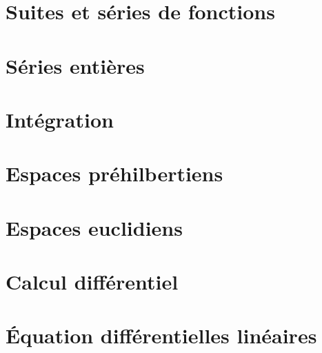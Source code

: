 \documentclass[12pt]{article}
\theoremstyle{remark}
\begin{document}
\cleardoublepage
\section{Suites et séries de fonctions}
\cleardoublepage
\section{Séries entières}
\cleardoublepage
\section{Intégration}
\cleardoublepage
\section{Espaces préhilbertiens}
\cleardoublepage
\section{Espaces euclidiens}
\cleardoublepage
\section{Calcul différentiel}
\cleardoublepage
\section{\'Equation différentielles linéaires}
\end{document}
